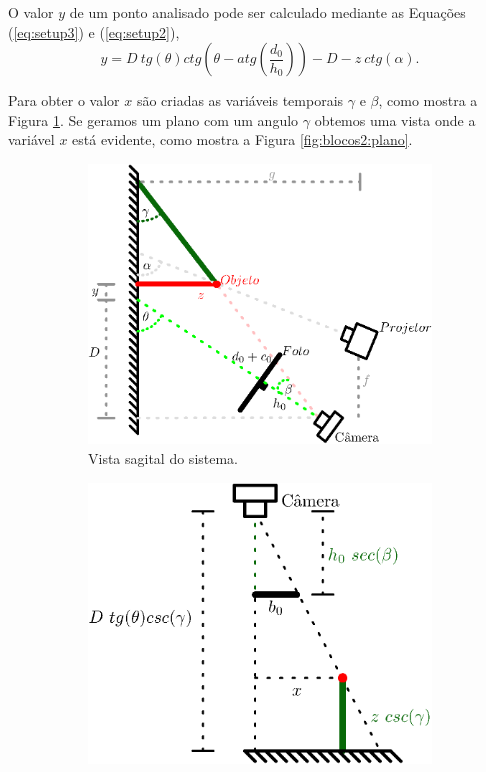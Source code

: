 \documentclass[a4paper, 12pt]{article}
\begin{document}
O valor $y$ de um ponto analisado pode ser calculado mediante as
Equações (\ref{eq:setup3}) e (\ref{eq:setup2}),
\begin{equation}\label{eq:setup3}
y=D~tg(\theta)ctg\left(\theta-atg\left(\frac{d_0}{h_0}\right)\right)-D-z~ctg(\alpha).
\end{equation}

Para obter o valor $x$ são criadas as variáveis temporais $\gamma$ e $\beta$, como mostra 
a Figura \ref{fig:blocos2:sagital}.
Se geramos um plano com um angulo $\gamma$
obtemos uma vista onde a variável $x$ está evidente, como mostra a Figura \ref{fig:blocos2:plano}.
\begin{figure}[!h]
     \centering
     \begin{subfigure}[b]{0.475\textwidth}
         \centering
         \includegraphics[width=\textwidth]{Diagrama5.eps}
         \caption{Vista sagital do sistema.}
         \label{fig:blocos2:sagital}
     \end{subfigure}
     \hfill
     \begin{subfigure}[b]{0.475\textwidth}
         \centering
         \includegraphics[width=\textwidth]{Diagrama4.eps}

\end{subfigure}
\end{figure}
\end{document}
